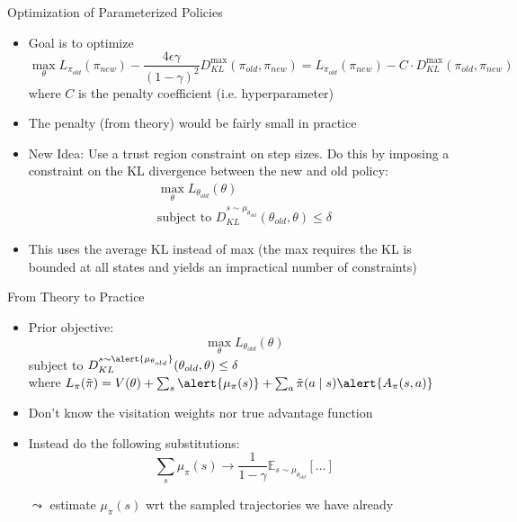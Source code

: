 \documentclass[aspectratio=169]{../latex_main/tntbeamer}  %
\begin{document}
\begin{frame}[c]{Optimization of Parameterized Policies}
	
    \begin{itemize}
        \item Goal is to optimize
        $$\max_{\theta}  L_{\pi_{old}} (\pi_{new}) -  \frac{4\epsilon\gamma}{(1-\gamma)^2} D_{KL}^{\max}(\pi_{old}, \pi_{new}) = L_{\pi_{old}} (\pi_{new}) -  C \cdot D_{KL}^{\max}(\pi_{old}, \pi_{new}) $$
        where $C$ is the penalty coefficient (i.e. hyperparameter)
        \item The penalty (from theory) would be fairly small in practice
        \medskip
        \item New Idea: Use a trust region constraint on step sizes. Do this by imposing a constraint on the KL divergence between the new and old policy:
        \begin{eqnarray}
        \max_{\theta} L_{\theta_{old}} (\theta)\\
        \text{subject to } D_{KL}^{s \sim \mu_{\theta_{old}}} (\theta_{old}, \theta) \leq \delta
        \end{eqnarray}
        \item This uses the average KL instead of max (the max requires the KL is bounded at all states and yields an impractical number of constraints)
    \end{itemize}
    
\end{frame}
\begin{frame}[c]{From Theory to Practice}
	
    \begin{itemize}
        \item Prior objective:
        $$ \max_{\theta} L_{\theta_{old}} (\theta)$$
        {\centering subject to $ D_{KL}^{s \sim \alert{\mu_{\theta_{old}}}} (\theta_{old}, \theta) \leq \delta$\\}
        where $ L_\pi(\Tilde{\pi}) = V(\theta) + \sum_{s} \alert{\mu_\pi (s)} + \sum_{a} \Tilde{\pi}(a \mid s) \alert{A_\pi(s,a)}$ 
        \item Don't know the visitation weights nor true advantage function
        \pause
        \item Instead do the following substitutions:
        $$ \sum_{s} \mu_\pi (s) \to \frac{1}{1- \gamma} \mathbb{E}_{s\sim \mu_{\theta_{old}}} [\ldots]$$
        \item[$\leadsto$] estimate $\mu_\pi (s)$ wrt the sampled trajectories we have already
    \end{itemize}

\end{frame}
\end{document}
